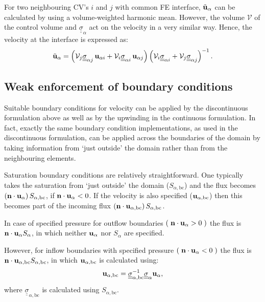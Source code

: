 \documentclass[times]{fldauth}
\begin{document}
For two neighbouring CV's $i$ and $j$ with common FE interface,
$\tilde{\bf u}_\alpha$ can be calculated by using a volume-weighted
harmonic mean. However, the volume $\mathcal{V}$ of the control volume
and $\underline{\underline{\sigma}}_{\alpha}$ act on the velocity in a
very similar way. Hence, the velocity at the interface is expressed
as:
\begin{equation} 
  {\tilde{\bf u}_\alpha} =  \left(\mathcal{V}_{j}  
    \underline{\underline{\sigma}}_{\alpha j} \, {\bf
      u}_{\alpha i} + \mathcal{V}_{i} \underline{\underline{\sigma}}_{\alpha i}\, {\bf
      u}_{\alpha j} \right) \left(  \mathcal{V}_{i} 
    \underline{\underline{\sigma}}_{\alpha i} +
    \mathcal{V}_{j} 
    \underline{\underline{\sigma}}_{\alpha j} \right)^{-1}.
\end{equation} 


\subsection{Weak enforcement of boundary conditions}\label{bcs-rel-perm} 
Suitable boundary conditions for velocity can be applied by the
discontinuous formulation above as well as by the upwinding in the
continuous formulation. In fact, exactly the same boundary condition
implementations, as used in the discontinuous formulation, can be
applied across the boundaries of the domain by taking information from
`just outside' the domain rather than from the neighbouring elements.

Saturation boundary conditions are relatively straightforward. One
typically takes the saturation from `just outside' the domain
($S_{\alpha, \text{bc}}$) and the flux becomes $\left({\bf n}\cdot
{\bf u}_{\alpha}\right)S_{\alpha,\text{bc}}$, if ${\bf n}\cdot {\bf
  u}_{\alpha} < 0$. If the velocity is also specified (${\bf
  u}_{\alpha,\text{bc}}$) then this becomes part of the incoming flux
$\left({\bf n}\cdot {\bf
  u}_{\alpha,\text{bc}}\right)S_{\alpha,\text{bc}}$.

In case of specified pressure for outflow boundaries
$\left(\right.{\bf n}\cdot {\bf u}_\alpha>0\left.\right)$ the flux is
${\bf n}\cdot {\bf u}_\alpha {S_\alpha}$, in which neither ${\bf
  u}_\alpha$ nor ${S_\alpha}$ are specified.

However, for inflow boundaries with specified pressure
$\left(\right.{\bf n}\cdot {\bf u}_\alpha<0\left.\right)$ the flux is
${\bf n}\cdot {\bf u}_{\alpha,\text{bc}} S_{\alpha,\text{bc}}$, in
which ${\bf u}_{\alpha,\text{bc}}$ is calculated using:
\begin{equation}
  {\bf u}_{\alpha,\text{bc}} = 
    \underline{\underline{\sigma}}_{\alpha,\text{bc}} ^{-1}
    \underline{\underline{\sigma}}_{\alpha}  
              {\bf u}_{\alpha},
\end{equation}
where $\underline{\underline{\sigma}}_{\alpha,\text{bc}}$ is
calculated using $S_{\alpha,\text{bc}}$.
\end{document}
